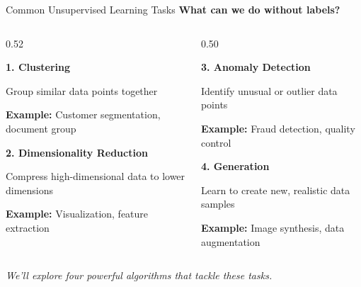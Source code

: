 \begin{frame}{Common Unsupervised Learning Tasks}
\textbf{What can we do without labels?}

\begin{columns}[t]
\begin{column}{0.52\textwidth}
\begin{tcolorbox}[colback=blue!5, colframe=blue!50, height=2.7cm]
\textbf{1. Clustering}

Group similar data points together

\textbf{Example:} Customer segmentation, document group
\end{tcolorbox}

\vspace{0.5em}

\begin{tcolorbox}[colback=red!5, colframe=red!50, height=2.7cm]
\textbf{2. Dimensionality Reduction}

Compress high-dimensional data to lower dimensions

\textbf{Example:} Visualization, feature extraction
\end{tcolorbox}
\end{column}

\begin{column}{0.50\textwidth}
\begin{tcolorbox}[colback=orange!5, colframe=orange!50, height=2.7cm]
\textbf{3. Anomaly Detection}

Identify unusual or outlier data points

\textbf{Example:} Fraud detection, quality control
\end{tcolorbox}

\vspace{0.5em}

\begin{tcolorbox}[colback=purple!5, colframe=purple!50, height=2.7cm]
\textbf{4. Generation}

Learn to create new, realistic data samples

\textbf{Example:} Image synthesis, data augmentation
\end{tcolorbox}
\end{column}
\end{columns}

\vspace{0.5em}
\centering
\small \textit{We'll explore four powerful algorithms that tackle these tasks.}
\end{frame}

